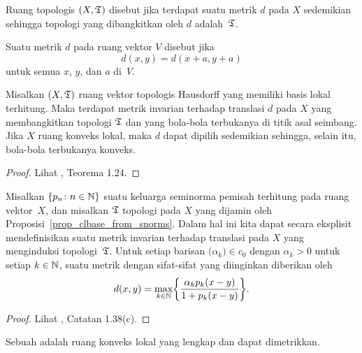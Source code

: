 \begin{defn} Ruang topologis $(X,\mathfrak{T})$ disebut
 jika terdapat suatu metrik $d$ pada $X$ sedemikian sehingga topologi yang dibangkitkan oleh $d$ adalah~$\mathfrak{T}$.
\end{defn}

\begin{defn} Suatu metrik $d$ pada ruang vektor $V$ disebut
 jika
   \[ d(x,y) = d(x + a, y + a) \]
untuk semua $x$, $y$, dan $a$ di~$V$.
\end{defn}

\begin{prop} Misalkan $(X,\mathfrak{T})$ ruang vektor topologis Hausdorff yang memiliki basis lokal terhitung. Maka terdapat metrik
invarian terhadap translasi $d$ pada $X$ yang membangkitkan topologi $\mathfrak{T}$ dan yang bola-bola terbukanya di titik asal seimbang. Jika $X$ ruang konveks lokal,
maka $d$ dapat dipilih sedemikian sehingga, selain itu, bola-bola terbukanya konveks.
\end{prop}

\begin{proof} Lihat \cite{Rudin:1991}, Teorema 1.24.  \ns
\end{proof}

\begin{exam}\label{X_metric_from_seminorms} Misalkan $\{p_n\colon n \in \mathbb{N}\}$ suatu keluarga seminorma pemisah terhitung pada ruang
vektor~$X$, dan misalkan $\mathfrak{T}$ topologi pada $X$ yang dijamin oleh Proposisi~\ref{prop_clbase_from_snorms}. Dalam hal ini kita dapat secara eksplisit
mendefinisikan suatu metrik invarian terhadap translasi pada $X$ yang menginduksi topologi~$\mathfrak{T}$. Untuk setiap barisan $\bigl(\alpha_k\bigr) \in c_0$
dengan $\alpha_k>0$ untuk setiap $k\in\mathbb{N}$, suatu metrik dengan sifat-sifat yang diinginkan diberikan oleh
   \[ d(x,y) = \max_{k \in \mathbb{N}}\biggl\{\frac{\alpha_k p_k(x-y)}{1 + p_k(x-y)}\biggr\}. \]
\end{exam}

\begin{proof} Lihat \cite{Rudin:1991}, Catatan 1.38(c).  \ns
\end{proof}

\begin{defn} Sebuah
 adalah ruang konveks lokal yang lengkap dan dapat dimetrikkan.
\end{defn}

